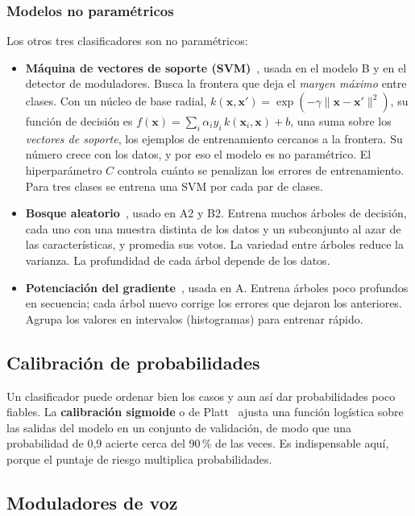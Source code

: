 \documentclass[11pt,a4paper]{article}
\begin{document}
\subsubsection{Modelos no paramétricos}

Los otros tres clasificadores son no paramétricos:
\begin{itemize}
  \item \textbf{Máquina de vectores de soporte (SVM)}~\cite{svm1995}, usada en el modelo B y en el detector de moduladores. Busca la frontera que deja el \emph{margen máximo} entre clases. Con un núcleo de base radial, $k(\mathbf{x},\mathbf{x}') = \exp(-\gamma\lVert\mathbf{x}-\mathbf{x}'\rVert^2)$, su función de decisión es $f(\mathbf{x}) = \sum_{i} \alpha_i y_i\, k(\mathbf{x}_i, \mathbf{x}) + b$, una suma sobre los \emph{vectores de soporte}, los ejemplos de entrenamiento cercanos a la frontera. Su número crece con los datos, y por eso el modelo es no paramétrico. El hiperparámetro $C$ controla cuánto se penalizan los errores de entrenamiento. Para tres clases se entrena una SVM por cada par de clases.
  \item \textbf{Bosque aleatorio}~\cite{rf2001}, usado en A2 y B2. Entrena muchos árboles de decisión, cada uno con una muestra distinta de los datos y un subconjunto al azar de las características, y promedia sus votos. La variedad entre árboles reduce la varianza. La profundidad de cada árbol depende de los datos.
  \item \textbf{Potenciación del gradiente}~\cite{friedman2001}, usada en A. Entrena árboles poco profundos en secuencia; cada árbol nuevo corrige los errores que dejaron los anteriores. Agrupa los valores en intervalos (histogramas) para entrenar rápido.
\end{itemize}

\subsection{Calibración de probabilidades}
\label{sec:calibracion}

Un clasificador puede ordenar bien los casos y aun así dar probabilidades poco fiables. La \textbf{calibración sigmoide} o de Platt~\cite{platt1999} ajusta una función logística sobre las salidas del modelo en un conjunto de validación, de modo que una probabilidad de 0,9 acierte cerca del 90\,\% de las veces. Es indispensable aquí, porque el puntaje de riesgo multiplica probabilidades.

\subsection{Moduladores de voz}
\label{sec:moduladores_teoria}
\end{document}

